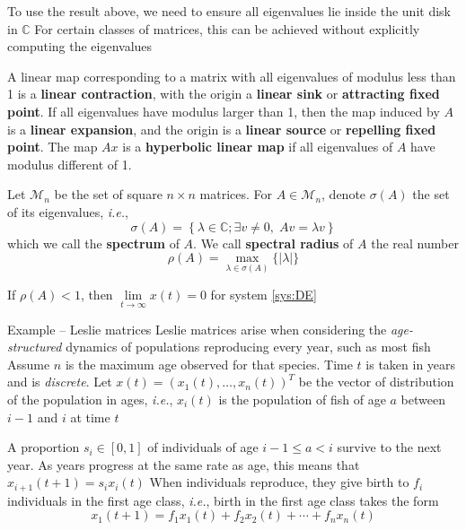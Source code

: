 \documentclass{beamer}
\def\IC{\mathbb{C}}
\def\M{\mathcal{M}}
\def\ie{\emph{i.e.}}
\def\defword#1{\textbf{#1}}
\begin{document}
\begin{frame}
To use the result above, we need to ensure all eigenvalues lie inside the unit disk in $\IC$
\vfill
For certain classes of matrices, this can be achieved without explicitly computing the eigenvalues
\vfill

A linear map corresponding to a matrix with all eigenvalues of modulus less than 1 is a \defword{linear contraction}, with the origin a \defword{linear sink} or \defword{attracting fixed point}. If all eigenvalues have modulus larger than 1, then the map induced by $A$ is a \defword{linear expansion}, and the origin is a \defword{linear source} or \defword{repelling fixed point}.
The map $Ax$ is a \defword{hyperbolic linear map} if all eigenvalues of $A$ have modulus different of 1.
\end{frame}

\begin{frame}
\begin{definition}
Let $\M_n$ be the set of square $n\times n$ matrices. For $A\in\M_n$, denote $\sigma(A)$ the set of its eigenvalues, \ie,
\[
\sigma(A)=\left\{
\lambda\in\IC; \exists v\neq 0,\; Av=\lambda v
\right\}
\]
which we call the \defword{spectrum} of $A$. We call \defword{spectral radius} of $A$ the real number
\[
\rho(A)=\max_{\lambda\in\sigma(A)}\{|\lambda|\}
\]
\end{definition}

\begin{theorem}\label{th:matrix_everywhere_rho_l_1_goes0}
If $\rho(A)<1$, then $\lim\limits_{t\to \infty} x(t)=0$ for system \eqref{sys:DE}
\end{theorem}
\end{frame}


\begin{frame}{Example -- Leslie matrices}
Leslie matrices arise when considering the \emph{age-structured} dynamics of populations reproducing every year, such as most fish
\vfill
Assume $n$ is the maximum age observed for that species. Time $t$ is taken in years and is \emph{discrete}.
Let $x(t)=(x_1(t),\ldots,x_n(t))^T$ be the vector of distribution of the population in ages, \ie, $x_i(t)$ is the population of fish of age $a$ between $i-1$ and $i$ at time $t$
\vfill


A proportion $s_i\in[0,1]$ of individuals of age $i-1\leq a<i$ survive to the next year. As years progress at the same rate as age, this means that $x_{i+1}(t+1) = s_i x_i(t)$
\vfill
When individuals reproduce, they give birth to $f_i$ individuals in the first age class, \ie, birth in the first age class takes the form
\[
x_1(t+1)=f_1x_1(t)+f_2x_2(t)+\cdots+f_nx_n(t)
\]
\end{frame}
\end{document}
